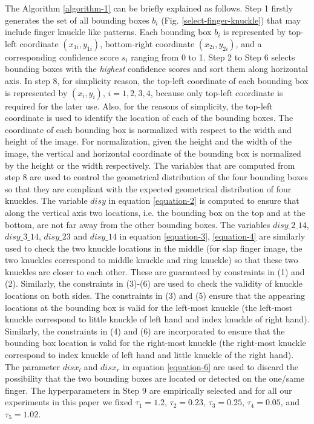 The Algorithm \ref{algorithm-1} can be briefly explained as follows. Step 1 firstly generates the set of all bounding boxes $b_i$ (Fig. \ref{select-finger-knuckle}) that may include finger knuckle like patterns. Each bounding box $b_i$ is represented by top-left coordinate $(x_{1i},y_{1i})$, bottom-right coordinate $(x_{2i},y_{2i})$, and a corresponding confidence score $s_i$ ranging from 0 to 1. Step 2 to Step 6 selects bounding boxes with the \textit{highest} confidence scores and sort them along horizontal axis. In step 8, for simplicity reason, the top-left coordinate of each bounding box is represented by $(x_i,y_i)$, $i=1,2,3,4$, because only top-left coordinate is required for the later use. Also, for the reasons of simplicity, the top-left coordinate is used to identify the location of each of the bounding boxes. The coordinate of each bounding box is normalized with respect to the width and height of the image. For normalization, given the height and the width of the image, the vertical and horizontal coordinate of the bounding box is normalized by the height or the width respectively. The variables that are computed from step 8 are used to control the geometrical distribution of the four bounding boxes so that they are compliant with the expected geometrical distribution of four knuckles. The variable $disy$ in equation \ref{equation-2} is computed to ensure that along the vertical axis two locations, i.e. the bounding box on the top and at the bottom, are not far away from the other bounding boxes. The variables $disy\_2\_14$, $disy\_3\_14$, $disy\_23$ and $disy\_14$ in equation \ref{equation-3}, \ref{equation-4} are similarly used to check the two knuckle locations in the middle (for slap finger image, the two knuckles correspond to middle knuckle and ring knuckle) so that these two knuckles are closer to each other. These are guaranteed by constraints in (1) and (2). Similarly, the constraints in (3)-(6) are used to check the validity of knuckle locations on both sides. The constraints in (3) and (5) ensure that the appearing locations at the bounding box is valid for the left-most knuckle (the left-most knuckle correspond to little knuckle of left hand and index knuckle of right hand). Similarly, the constraints in (4) and (6) are incorporated to ensure that the bounding box location is valid for the right-most knuckle (the right-most knuckle correspond to index knuckle of left hand and little knuckle of the right hand). The parameter $disx_l$ and $disx_r$ in equation \ref{equation-6} are used to discard the possibility that the two bounding boxes are located or detected on the one/same finger. The hyperparameters in Step 9 are empirically selected and for all our experiments in this paper we fixed $\tau_1=1.2$, $\tau_2=0.23$, $\tau_3=0.25$, $\tau_4=0.05$, and $\tau_5=1.02$.

